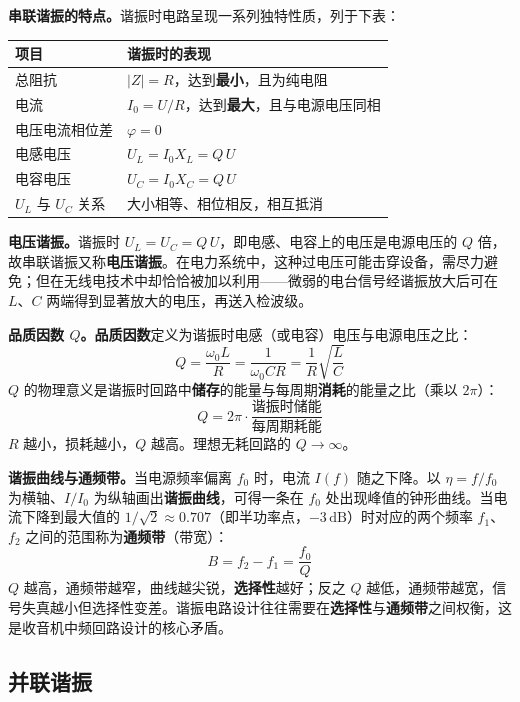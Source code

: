 \documentclass[12pt,UTF8]{ctexbook}
\begin{document}
\textbf{串联谐振的特点。}谐振时电路呈现一系列独特性质，列于下表：

\begin{center}
\begin{tabular}{ll}
\hline
\textbf{项目} & \textbf{谐振时的表现} \\
\hline
总阻抗 & $|Z|=R$，达到\textbf{最小}，且为纯电阻 \\
电流 & $I_0 = U/R$，达到\textbf{最大}，且与电源电压同相 \\
电压电流相位差 & $\varphi = 0$ \\
电感电压 & $U_L = I_0 X_L = Q\,U$ \\
电容电压 & $U_C = I_0 X_C = Q\,U$ \\
$U_L$ 与 $U_C$ 关系 & 大小相等、相位相反，相互抵消 \\
\hline
\end{tabular}
\end{center}

\textbf{电压谐振。}谐振时 $U_L=U_C=Q\,U$，即电感、电容上的电压是电源电压的 $Q$ 倍，故串联谐振又称\textbf{电压谐振}。在电力系统中，这种过电压可能击穿设备，需尽力避免；但在无线电技术中却恰恰被加以利用——微弱的电台信号经谐振放大后可在 $L$、$C$ 两端得到显著放大的电压，再送入检波级。

\textbf{品质因数 $Q$。}\textbf{品质因数}定义为谐振时电感（或电容）电压与电源电压之比：
\[
\boxed{\;Q = \frac{\omega_0 L}{R} = \frac{1}{\omega_0 C R} = \frac{1}{R}\sqrt{\frac{L}{C}}\;}
\]
$Q$ 的物理意义是谐振时回路中\textbf{储存}的能量与每周期\textbf{消耗}的能量之比（乘以 $2\pi$）：
\[
Q = 2\pi \cdot \frac{\text{谐振时储能}}{\text{每周期耗能}}
\]
$R$ 越小，损耗越小，$Q$ 越高。理想无耗回路的 $Q\to\infty$。

\textbf{谐振曲线与通频带。}当电源频率偏离 $f_0$ 时，电流 $I(f)$ 随之下降。以 $\eta = f/f_0$ 为横轴、$I/I_0$ 为纵轴画出\textbf{谐振曲线}，可得一条在 $f_0$ 处出现峰值的钟形曲线。当电流下降到最大值的 $1/\sqrt{2}\approx 0.707$（即半功率点，$-3\,\mathrm{dB}$）时对应的两个频率 $f_1$、$f_2$ 之间的范围称为\textbf{通频带}（带宽）：
\[
\boxed{\;B = f_2 - f_1 = \frac{f_0}{Q}\;}
\]
$Q$ 越高，通频带越窄，曲线越尖锐，\textbf{选择性}越好；反之 $Q$ 越低，通频带越宽，信号失真越小但选择性变差。谐振电路设计往往需要在\textbf{选择性}与\textbf{通频带}之间权衡，这是收音机中频回路设计的核心矛盾。


\subsection{并联谐振}
\end{document}
